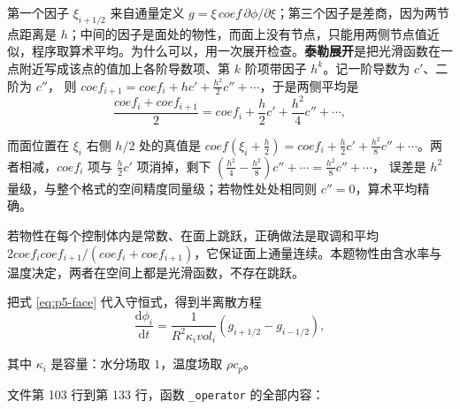 第一个因子 $\xi_{i+1/2}$ 来自通量定义 $g=\xi\,coef\,\partial\phi/\partial\xi$；第三个因子是差商，因为两节点距离是 $h$；中间的因子是面处的物性，而面上没有节点，只能用两侧节点值近似，程序取算术平均。为什么可以，用一次展开检查。\textbf{泰勒展开}是把光滑函数在一点附近写成该点的值加上各阶导数项、第 $k$ 阶项带因子 $h^k$。记一阶导数为 $c'$、二阶为 $c''$，
则 $coef_{i+1}=coef_i+hc'+\frac{h^2}{2}c''+\cdots$，于是两侧平均是
\begin{equation}
\frac{coef_i+coef_{i+1}}{2}=coef_i+\frac h2c'+\frac{h^2}{4}c''+\cdots ,
\end{equation}

而面位置在 $\xi_i$ 右侧 $h/2$ 处的真值是 $coef\left(\xi_i+\frac h2\right)=coef_i+\frac h2c'+\frac{h^2}{8}c''+\cdots$。两者相减，$coef_i$ 项与 $\frac h2c'$ 项消掉，剩下 $\left(\frac{h^2}{4}-\frac{h^2}{8}\right)c''+\cdots=\frac{h^2}{8}c''+\cdots$，
误差是 $h^2$ 量级，与整个格式的空间精度同量级；若物性处处相同则 $c''=0$，算术平均精确。

若物性在每个控制体内是常数、在面上跳跃，正确做法是取调和平均 $2coef_icoef_{i+1}/(coef_i+coef_{i+1})$，它保证面上通量连续。本题物性由含水率与温度决定，两者在空间上都是光滑函数，不存在跳跃。

把式 \eqref{eq:p5-face} 代入守恒式，得到半离散方程
\begin{equation}
\frac{\mathrm{d}\phi_i}{\mathrm{d}t}=\frac{1}{R^2\kappa_ivol_i}\left(g_{i+1/2}-g_{i-1/2}\right),
\label{eq:p5-fvode}
\end{equation}

其中 $\kappa_i$ 是容量：水分场取 $1$，温度场取 $\rho c_p$。

文件第 103 行到第 133 行，函数 \texttt{\_operator} 的全部内容：

